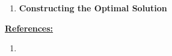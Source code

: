 \documentclass[12pt]{article}
\begin{document}
\begin{enumerate}[1.]
\begin{itemize}
\begin{itemize}
\begin{enumerate}[1.]
\begin{enumerate}[1)]
\begin{itemize}


                    \end{itemize}


                \end{enumerate}

                \item \textbf{Constructing the Optimal Solution}
            \end{enumerate}
        \end{itemize}

        \bigskip

        \underline{\textbf{References:}}

        \bigskip

        \begin{enumerate}[1)]
            \item
        \end{enumerate}
    \end{itemize}
\end{enumerate}
\end{document}
